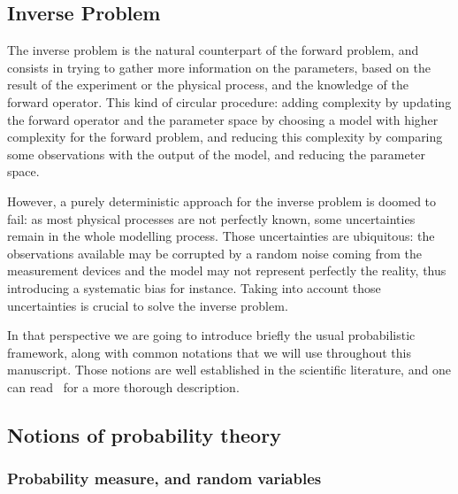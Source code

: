 \documentclass[../../Main_ManuscritThese.tex]{subfiles}
\begin{document}
\subsection{Inverse Problem}
The inverse problem is the natural counterpart of the forward problem, and consists in trying to gather more information on the parameters, based on the result of the experiment or the physical process, and the knowledge of the forward operator. This kind of circular procedure: adding complexity by updating the forward operator and the parameter space by choosing a model with higher complexity for the forward problem, and reducing this complexity by comparing some observations with the output of the model, and reducing the parameter space. 

However, a purely deterministic approach for the inverse problem is doomed to fail: as most physical processes are not perfectly known, some uncertainties remain in the whole modelling process. Those uncertainties are ubiquitous: the observations available may be corrupted by a random noise coming from the measurement devices and the model may not represent perfectly the reality, thus introducing a systematic bias for instance. Taking into account those uncertainties is crucial to solve the inverse problem.


In that perspective we are going to introduce briefly the usual probabilistic framework, along with common notations that we will use throughout this manuscript. Those notions are well established in the scientific literature, and one can read~\cite{billingsley_probability_2008} for a more thorough description.
\subsection{Notions of probability theory}
\subsubsection{Probability measure, and random variables}
\label{sec:notion_prob_theory}
\end{document}

